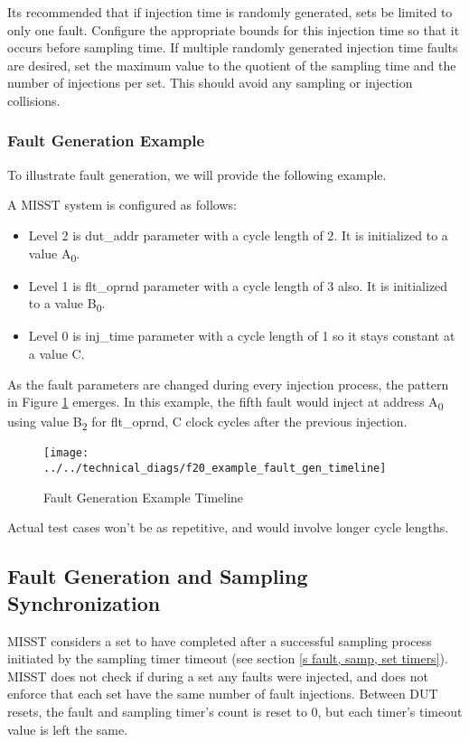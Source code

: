 \documentclass[]{report}
\begin{document}
Its recommended that if injection time is randomly generated, sets be limited to only one fault. Configure the appropriate bounds for this injection time so that it occurs before sampling time. If multiple randomly generated injection time faults are desired, set the maximum value to the quotient of the sampling time and the number of injections per set. This should avoid any sampling or injection collisions.

\subsubsection{Fault Generation Example}
\label{ss fault gen example}

To illustrate fault generation, we will provide the following example.

A MISST system is configured as follows:
\begin{itemize}
	\item Level 2 is dut\_addr parameter with a cycle length of 2. It is initialized to a value A\textsubscript{0}.
	\item Level 1 is flt\_oprnd parameter with a cycle length of 3 also. It is initialized to a value B\textsubscript{0}.
	\item Level 0 is inj\_time parameter with a cycle length of 1 so it stays constant at a value C.
\end{itemize}

As the fault parameters are changed during every injection process, the pattern in Figure \ref{fig:example fault gen timeline} emerges. In this example, the fifth fault would inject at address A\textsubscript{0} using value B\textsubscript{2} for flt\_oprnd, C clock cycles after the previous injection.  

\begin{figure}[h]
	\centering
	\texttt{[image: ../../technical\_diags/f20\_example\_fault\_gen\_timeline]}
	\caption{Fault Generation Example Timeline}
	\label{fig:example fault gen timeline}
\end{figure}

Actual test cases won't be as repetitive, and would involve longer cycle lengths. 

\subsection{Fault Generation and Sampling Synchronization}

MISST considers a set to have completed after a successful sampling process initiated by the sampling timer timeout (see section \ref{s fault, samp, set timers}). MISST does not check if during a set any faults were injected, and does not enforce that each set have the same number of fault injections. Between DUT resets, the fault and sampling timer's count is reset to 0, but each timer's timeout value is left the same.
\end{document}
